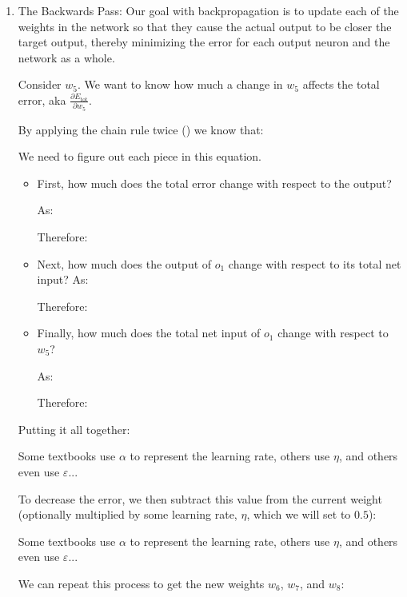 \begin{enumerate}
		
		\item The Backwards Pass:
		Our goal with backpropagation is to update each of the weights in the network so that they cause the actual output to be closer the target output, thereby minimizing the error for each output neuron and the network as a whole.
		
		Consider $w_5$. We want to know how much a change in $w_5$ affects the total error, aka $\frac{\partial E_{\text{tot}}}{\partial w_{5}}$.
		
		By applying the chain rule twice () we know that:
		
		We need to figure out each piece in this equation.
		\begin{itemize}
			\item First, how much does the total error change with respect to the output?
			
			As:
			
			Therefore:
			
			
			\item Next, how much does the output of $o_1$ change with respect to its total net input?
			As:
			
			Therefore:
			
			
			\item Finally, how much does the total net input of $o_1$ change with respect to $w_5$?
			
			As:
			
			Therefore:
			
		\end{itemize}
		Putting it all together:
		
		\begin{tcolorbox}[title=Remark,colframe=black,arc=10pt]
		Some textbooks use $\alpha$ to represent the learning rate, others use $\eta$, and others even use $\varepsilon$...
		\end{tcolorbox}
		To decrease the error, we then subtract this value from the current weight (optionally multiplied by some learning rate, $\eta$, which we will set to $0.5$):
		
		\begin{tcolorbox}[title=Remark,colframe=black,arc=10pt]
		Some textbooks use $\alpha$ to represent the learning rate, others use $\eta$, and others even use $\varepsilon$...
		\end{tcolorbox}
		We can repeat this process to get the new weights $w_6$, $w_7$, and $w_8$:
		

\end{enumerate}
